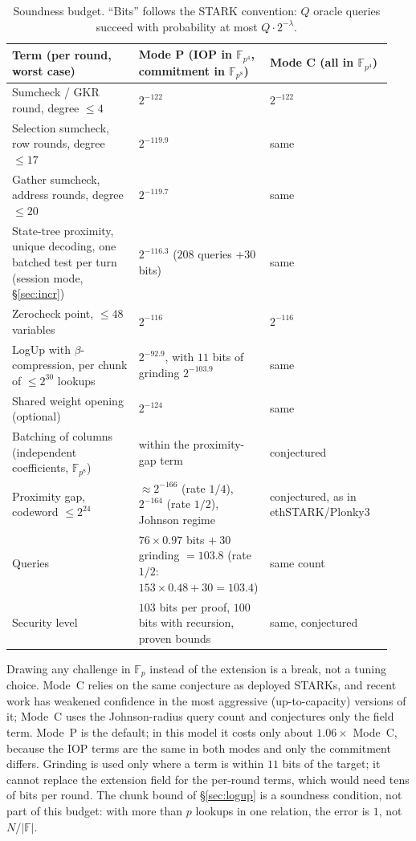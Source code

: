 \documentclass[11pt]{article}
\newcommand{\F}{\mathbb{F}}
\newcommand{\Fp}{\F_p}
\newcommand{\Fq}{\F_{p^4}}
\newcommand{\Fo}{\F_{p^8}}
\begin{document}
\begin{table}[h]
\centering\small
\begin{tabular}{@{}p{0.32\linewidth}p{0.31\linewidth}p{0.31\linewidth}@{}}
\toprule
Term (per round, worst case) & Mode P (IOP in \(\Fq\), commitment in \(\Fo\)) & Mode C (all in \(\Fq\)) \\
\midrule
Sumcheck / GKR round, degree \(\le 4\) & \(2^{-122}\) & \(2^{-122}\) \\
Selection sumcheck, row rounds, degree \(\le 17\) & \(2^{-119.9}\) & same \\
Gather sumcheck, address rounds, degree \(\le 20\) & \(2^{-119.7}\) & same \\
State-tree proximity, unique decoding, one batched test per turn (session mode, \S\ref{sec:incr}) & \(2^{-116.3}\) (\(208\) queries \(+ 30\) bits) & same \\
Zerocheck point, \(\le 48\) variables & \(2^{-116}\) & \(2^{-116}\) \\
LogUp with \(\beta\)-compression, per chunk of \(\le 2^{30}\) lookups & \(2^{-92.9}\), with \(11\) bits of grinding \(2^{-103.9}\) & same \\
Shared weight opening (optional) & \(2^{-124}\) & same \\
Batching of columns (independent coefficients, \(\Fo\)) & within the proximity-gap term & conjectured \\
Proximity gap, codeword \(\le 2^{24}\) & \(\approx 2^{-166}\) (rate \(1/4\)), \(2^{-164}\) (rate \(1/2\)), Johnson regime \cite{bciks} & conjectured, as in ethSTARK/Plonky3 \\
Queries & \(76 \times 0.97\) bits \(+\ 30\) grinding \(= 103.8\) (rate \(1/2\): \(153 \times 0.48 + 30 = 103.4\)) & same count \\
\midrule
Security level & \(103\) bits per proof, \(100\) bits with recursion, proven bounds & same, conjectured \\
\bottomrule
\end{tabular}
\caption{Soundness budget. ``Bits'' follows the STARK convention: \(Q\) oracle queries succeed with probability at most \(Q\cdot 2^{-\lambda}\).}
\label{tab:budget}
\end{table}

Drawing any challenge in \(\Fp\) instead of the extension is a break, not a tuning choice.
Mode~C relies on the same conjecture as deployed STARKs, and recent work has weakened confidence in the most aggressive (up-to-capacity) versions of it; Mode~C uses the Johnson-radius query count and conjectures only the field term.
Mode~P is the default; in this model it costs only about \(1.06\times\) Mode~C, because the IOP terms are the same in both modes and only the commitment differs.
Grinding is used only where a term is within \(11\) bits of the target; it cannot replace the extension field for the per-round terms, which would need tens of bits per round.
The chunk bound of \S\ref{sec:logup} is a soundness condition, not part of this budget: with more than \(p\) lookups in one relation, the error is \(1\), not \(N/|\F|\).
\end{document}
